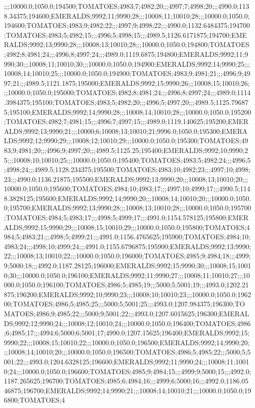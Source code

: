 ;;;10000.0;1050.0;194500;TOMATOES;4983;7;4982;20;;;4997;7;4998;20;;;4990.0;1138.34375;194600;EMERALDS;9992;11;9990;28;;;10008;11;10010;28;;;10000.0;1050.0;194600;TOMATOES;4983;9;4982;22;;;4997;9;4998;22;;;4990.0;1132.6484375;194700;TOMATOES;4983;5;4982;15;;;4996;5;4998;15;;;4989.5;1126.6171875;194700;EMERALDS;9992;13;9990;28;;;10008;13;10010;28;;;10000.0;1050.0;194800;TOMATOES;4982;8;4981;24;;;4996;8;4997;24;;;4989.0;1119.6875;194800;EMERALDS;9992;11;9990;30;;;10008;11;10010;30;;;10000.0;1050.0;194900;EMERALDS;9992;14;9990;25;;;10008;14;10010;25;;;10000.0;1050.0;194900;TOMATOES;4983;9;4981;21;;;4996;9;4997;21;;;4989.5;1121.1875;195000;EMERALDS;9992;15;9990;26;;;10008;15;10010;26;;;10000.0;1050.0;195000;TOMATOES;4982;8;4981;24;;;4996;8;4997;24;;;4989.0;1114.3984375;195100;TOMATOES;4983;5;4982;20;;;4996;5;4997;20;;;4989.5;1125.796875;195100;EMERALDS;9992;14;9990;28;;;10008;14;10010;28;;;10000.0;1050.0;195200;TOMATOES;4982;7;4981;15;;;4996;7;4997;15;;;4989.0;1119.140625;195200;EMERALDS;9992;13;9990;21;;;10000;6;10008;13;10010;21;9996.0;1050.0;195300;EMERALDS;9992;12;9990;29;;;10008;12;10010;29;;;10000.0;1050.0;195300;TOMATOES;4983;9;4981;20;;;4996;9;4997;20;;;4989.5;1125.25;195400;EMERALDS;9992;10;9990;25;;;10008;10;10010;25;;;10000.0;1050.0;195400;TOMATOES;4983;5;4982;24;;;4996;5;4998;24;;;4989.5;1128.234375;195500;TOMATOES;4983;10;4982;23;;;4997;10;4998;23;;;4990.0;1136.21875;195500;EMERALDS;9992;13;9990;20;;;10008;13;10010;20;;;10000.0;1050.0;195600;TOMATOES;4984;10;4983;17;;;4997;10;4999;17;;;4990.5;1148.3828125;195600;EMERALDS;9992;14;9990;20;;;10008;14;10010;20;;;10000.0;1050.0;195700;EMERALDS;9992;13;9990;28;;;10008;13;10010;28;;;10000.0;1050.0;195700;TOMATOES;4984;5;4983;17;;;4998;5;4999;17;;;4991.0;1154.578125;195800;EMERALDS;9992;15;9990;29;;;10008;15;10010;29;;;10000.0;1050.0;195800;TOMATOES;4984;5;4983;21;;;4998;5;4999;21;;;4991.0;1156.4765625;195900;TOMATOES;4984;10;4983;24;;;4998;10;4999;24;;;4991.0;1155.6796875;195900;EMERALDS;9992;13;9990;22;;;10008;13;10010;22;;;10000.0;1050.0;196000;TOMATOES;4985;9;4984;18;;;4999;9;5000;18;;;4992.0;1187.28125;196000;EMERALDS;9992;15;9990;30;;;10008;15;10010;30;;;10000.0;1050.0;196100;EMERALDS;9992;11;9990;27;;;10008;11;10010;27;;;10000.0;1050.0;196100;TOMATOES;4986;5;4985;19;;;5000;5;5001;19;;;4993.0;1202.21875;196200;EMERALDS;9992;10;9990;23;;;10008;10;10010;23;;;10000.0;1050.0;196200;TOMATOES;4986;5;4985;25;;;5000;5;5001;25;;;4993.0;1207.984375;196300;TOMATOES;4986;9;4985;22;;;5000;9;5001;22;;;4993.0;1207.6015625;196300;EMERALDS;9992;12;9990;24;;;10008;12;10010;24;;;10000.0;1050.0;196400;TOMATOES;4986;6;4985;17;;;4994;6;5000;6;5001;17;4990.0;1207.15625;196400;EMERALDS;9992;15;9990;22;;;10008;15;10010;22;;;10000.0;1050.0;196500;EMERALDS;9992;14;9990;20;;;10008;14;10010;20;;;10000.0;1050.0;196500;TOMATOES;4986;5;4985;22;;;5000;5;5001;22;;;4993.0;1204.6328125;196600;EMERALDS;9992;11;9990;24;;;10008;11;10010;24;;;10000.0;1050.0;196600;TOMATOES;4985;9;4984;15;;;4999;9;5000;15;;;4992.0;1187.265625;196700;TOMATOES;4985;6;4984;16;;;4999;6;5000;16;;;4992.0;1186.0546875;196700;EMERALDS;9992;14;9990;21;;;10008;14;10010;21;;;10000.0;1050.0;196800;TOMATOES;4